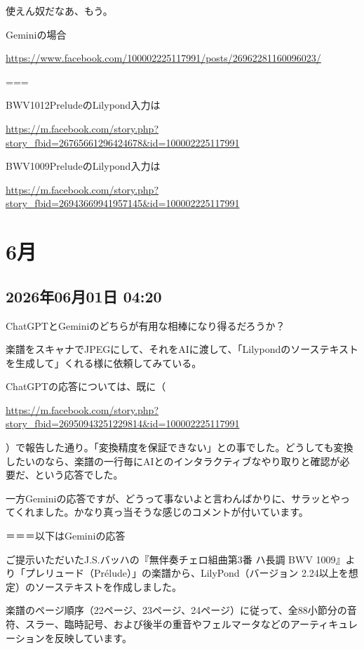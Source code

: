 \documentclass[facebook_diary.tex]{subfiles}
\begin{document}
使えん奴だなあ、もう。


Geminiの場合

\url{https://www.facebook.com/100002225117991/posts/26962281160096023/}




===

BWV1012PreludeのLilypond入力は

\url{https://m.facebook.com/story.php?story_fbid=26765661296424678&id=100002225117991}




BWV1009PreludeのLilypond入力は

\url{https://m.facebook.com/story.php?story_fbid=26943669941957145&id=100002225117991}



\section{6月}

\subsection*{2026年06月01日 04:20}

ChatGPTとGeminiのどちらが有用な相棒になり得るだろうか？


楽譜をスキャナでJPEGにして、それをAIに渡して、「Lilypondのソーステキストを生成して」くれる様に依頼してみている。


ChatGPTの応答については、既に（ 

\url{https://m.facebook.com/story.php?story_fbid=26950943251229814&id=100002225117991}

 ）で報告した通り。「変換精度を保証できない」との事でした。どうしても変換したいのなら、楽譜の一行毎にAIとのインタラクティブなやり取りと確認が必要だ、という応答でした。


一方Geminiの応答ですが、どうって事ないよと言わんばかりに、サラッとやってくれました。かなり真っ当そうな感じのコメントが付いています。


＝＝＝以下はGeminiの応答

ご提示いただいたJ.S.バッハの『無伴奏チェロ組曲第3番 ハ長調 BWV 1009』より「プレリュード（Prélude）」の楽譜から、LilyPond（バージョン 2.24以上を想定）のソーステキストを作成しました。


楽譜のページ順序（22ページ、23ページ、24ページ）に従って、全88小節分の音符、スラー、臨時記号、および後半の重音やフェルマータなどのアーティキュレーションを反映しています。
\end{document}
